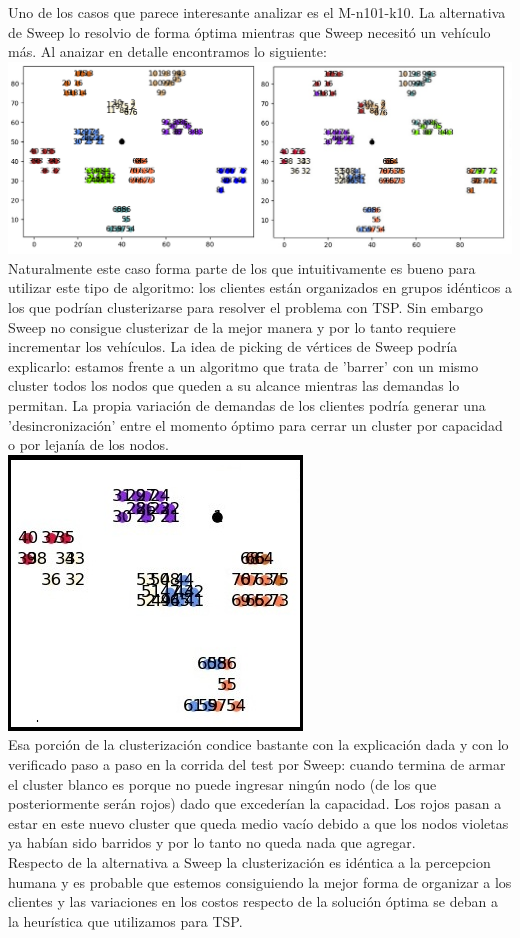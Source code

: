 \documentclass[11pt,a4paper]{article}
\begin{document}
\bigskip
Uno de los casos que parece interesante analizar es el M-n101-k10. La alternativa de Sweep lo resolvio de forma óptima mientras que Sweep necesitó un vehículo más. Al anaizar en detalle encontramos lo siguiente:
\includegraphics[scale=.6]{graf/cluster_caso_lindo.png}
\\
Naturalmente este caso forma parte de los que intuitivamente es bueno para utilizar este tipo de algoritmo: los clientes están organizados en grupos idénticos a los que podrían clusterizarse para resolver el problema con TSP. Sin embargo Sweep no consigue clusterizar de la mejor manera y por lo tanto requiere incrementar los vehículos. La idea de picking de vértices de Sweep podría explicarlo: estamos frente a un algoritmo que trata de 'barrer' con un mismo cluster todos los nodos que queden a su alcance mientras las demandas lo permitan. La propia variación de demandas de los clientes podría generar una 'desincronización' entre el momento óptimo para cerrar un cluster por capacidad o por lejanía de los nodos. \\
\center
\includegraphics[scale=.7]{graf/cluster_gonzalo_m101.png}
\\
Esa porción de la clusterización condice bastante con la explicación dada y con lo verificado paso a paso en la corrida del test por Sweep: cuando termina de armar el cluster blanco es porque no puede ingresar ningún nodo (de los que posteriormente serán rojos) dado que excederían la capacidad. Los rojos pasan a estar en este nuevo cluster que queda medio vacío debido a que los nodos violetas ya habían sido barridos y por lo tanto no queda nada que agregar.\\ 
Respecto de la alternativa a Sweep la clusterización es idéntica a la percepcion humana y es probable que estemos consiguiendo la mejor forma de organizar a los clientes y las variaciones en los costos respecto de la solución óptima se deban a la heurística que utilizamos para TSP.\\
\end{document}
